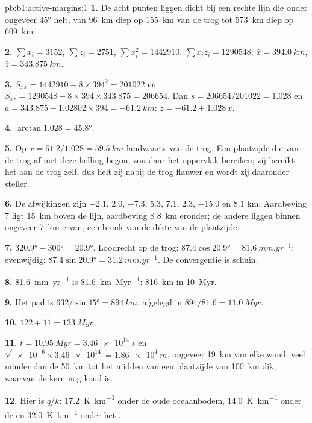 \begin{solution}{pb:b1:active-margins:1}
\textbf{1.} De acht punten liggen dicht bij een rechte lijn die onder ongeveer
\ang{45} helt, van \qty{96}{km} diep op \qty{155}{km} van de trog tot
\qty{573}{km} diep op \qty{609}{km}.

\textbf{2.} $\sum x_i = 3152$, $\sum z_i = 2751$, $\sum x_i^2 = \num{1442910}$,
$\sum x_i z_i = \num{1290548}$; $\bar x = \qty{394.0}{km}$,
$\bar z = \qty{343.875}{km}$.

\textbf{3.} $S_{xx} = 1442910 - 8\times394^2 = \num{201022}$ en
$S_{xz} = 1290548 - 8\times394\times343.875 = \num{206654}$. Dan
$s = 206654/201022 = 1.028$ en $a = 343.875 - 1.02802\times394 =
\qty{-61.2}{km}$: $z = -61.2 + 1.028\,x$.

\textbf{4.} $\arctan1.028 = \ang{45.8}$.

\textbf{5.} Op $x = 61.2/1.028 = \qty{59.5}{km}$ landwaarts van de trog. Een plaatzijde die van de trog af met deze helling begon, zou daar het oppervlak bereiken; zij bereikt het aan de trog zelf, dus helt zij nabij de trog flauwer en wordt zij daaronder steiler.

\textbf{6.} De afwijkingen zijn $-2.1$, $2.0$, $-7.3$, $5.3$, $7.1$, $2.3$,
$-15.0$ en $8.1$ \unit{km}. Aardbeving 7 ligt \qty{15}{km} boven de lijn, aardbeving 8
\qty{8}{km} eronder; de andere liggen binnen ongeveer \qty{7}{km} ervan, een breuk van de dikte van de plaatzijde.

\textbf{7.} $\ang{320.9} - \ang{300} = \ang{20.9}$. Loodrecht op de
trog: $87.4\cos\ang{20.9} = \qty{81.6}{mm.yr^{-1}}$; evenwijdig:
$87.4\sin\ang{20.9} = \qty{31.2}{mm.yr^{-1}}$. De convergentie is schuin.

\textbf{8.} \qty{81.6}{mm.yr^{-1}} is \qty{81.6}{km.Myr^{-1}}: \qty{816}{km} in
\qty{10}{Myr}.

\textbf{9.} Het pad is $632/\sin\ang{45} = \qty{894}{km}$, afgelegd in
$894/81.6 = \qty{11.0}{Myr}$.

\textbf{10.} $122 + 11 = \qty{133}{Myr}$.

\textbf{11.} $t = \qty{10.95}{Myr} = \qty{3.46e14}{s}$ en
$\sqrt{\num{e-6}\times\num{3.46e14}} = \qty{1.86e4}{m}$, ongeveer \qty{19}{km}
van elke wand: veel minder dan de \qty{50}{km} tot het midden van een plaatzijde van
\qty{100}{km} dik, waarvan de kern nog koud is.

\textbf{12.} Hier is $q/k$: \qty{17.2}{K.km^{-1}} onder de oude oceaanbodem,
\qty{14.0}{K.km^{-1}} onder de  en \qty{32.0}{K.km^{-1}} onder het
.


\end{solution}
